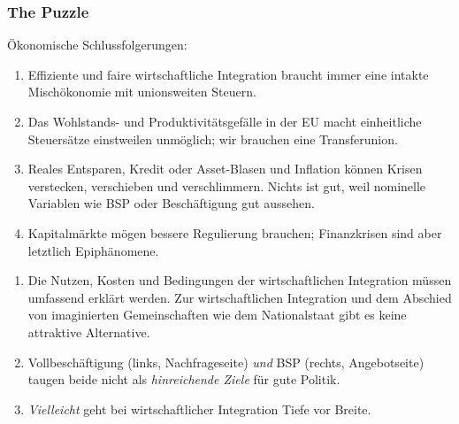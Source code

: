 \documentclass[]{beamer}
\begin{document}
\begin{frame}
\frametitle{The Puzzle}

Ökonomische Schlussfolgerungen:
\begin{enumerate}
	\item Effiziente und faire wirtschaftliche Integration braucht immer eine \alert{intakte Mischökonomie mit unionsweiten Steuern}.
	\item Das Wohlstands- und Produktivitätsgefälle in der EU macht einheitliche Steuersätze einstweilen unmöglich; wir brauchen eine \alert{Transferunion}.
	\item Reales Entsparen, Kredit oder Asset-Blasen und Inflation können Krisen verstecken, verschieben und verschlimmern.
	\alert{Nichts ist gut, weil nominelle Variablen wie BSP oder Beschäftigung gut aussehen.}
	\item Kapitalmärkte mögen bessere Regulierung brauchen; \alert{Finanzkrisen sind aber letztlich Epiphänomene}.
\end{enumerate}

\begin{enumerate}
	\item Die Nutzen, Kosten und Bedingungen der wirtschaftlichen Integration müssen \alert{umfassend erklärt} werden.
	Zur wirtschaftlichen Integration und dem \alert{Abschied von imaginierten Gemeinschaften} wie dem Nationalstaat gibt es keine attraktive Alternative.
	\item Vollbeschäftigung (links, Nachfrageseite) \emph{und} BSP (rechts, Angebotseite) \alert{taugen beide nicht als \emph{hinreichende Ziele} für gute Politik}.
	\item \emph{Vielleicht} geht bei wirtschaftlicher Integration \alert{Tiefe vor Breite}.
\end{enumerate}

\end{frame}
\end{document}
